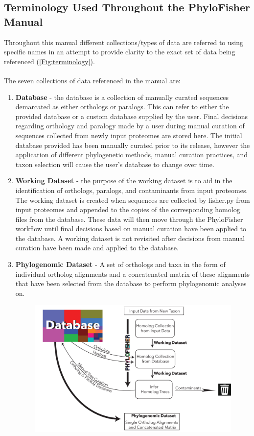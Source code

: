 \documentclass{article}
\begin{document}
        \subsection{Terminology Used Throughout the PhyloFisher Manual}
            Throughout this manual different collections/types of data are referred to using specific names in an attempt to provide clarity to the exact set of data being referenced (\autoref{Fig:terminology}). \\\\
            The seven collections of data referenced in the manual are:
            \begin{enumerate}
                \item \textbf{Database} - the database is a collection of manually curated sequences demarcated as either orthologs or paralogs. This can refer to either the provided database or a custom database supplied by the user. Final decisions regarding orthology and paralogy made by a user during manual curation of sequences collected from newly input proteomes are stored here. The initial database provided has been manually curated prior to its release, however the application of different phylogenetic methods, manual curation practices, and taxon selection will cause the user's database to change over time.
                \item \textbf{Working Dataset} - the purpose of the working dataset is to aid in the identification of orthologs, paralogs, and contaminants from input proteomes.  The working dataset is created when sequences are collected by fisher.py from input proteomes and appended to the copies of the corresponding homolog files from the database. These data will then move through the PhyloFisher workflow until final decisions based on manual curation have been applied to the database. A working dataset is not revisited after decisions from manual curation have been made and applied to the database.
                \item \textbf{Phylogenomic Dataset} - A set of orthologs and taxa in the form of individual ortholog alignments and a concatenated matrix of these alignments that have been selected from the database to perform phylogenomic analyses on. 
        \begin{figure}[H]
            \centering
        	 \includegraphics[width=\linewidth]{figures/Dataset_explanation_fig.pdf}

\end{figure}
\end{enumerate}
\end{document}
